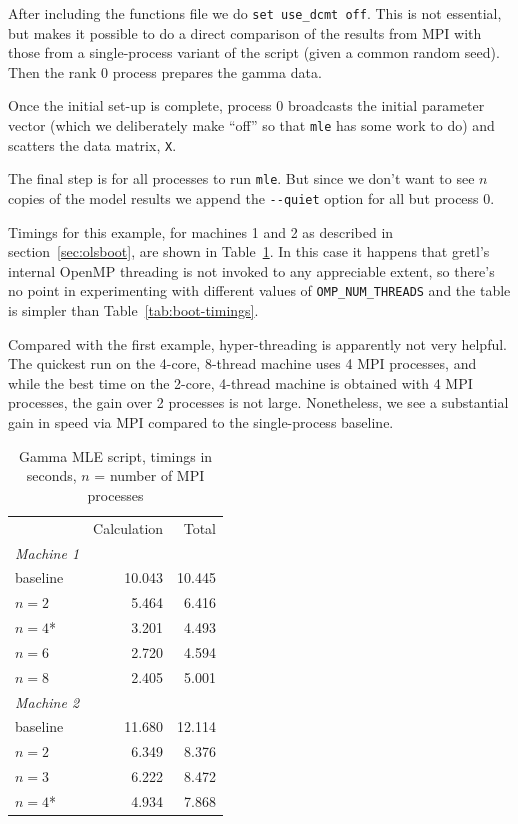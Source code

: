 \documentclass{article}
\begin{document}
After including the functions file we do \texttt{set use\_dcmt
  off}. This is not essential, but makes it possible to do a direct
comparison of the results from MPI with those from a single-process
variant of the script (given a common random seed). Then the rank 0
process prepares the gamma data.

Once the initial set-up is complete, process 0 broadcasts the initial
parameter vector (which we deliberately make ``off'' so that
\texttt{mle} has some work to do) and scatters the data matrix,
\texttt{X}.

The final step is for all processes to run \texttt{mle}. But since we
don't want to see $n$ copies of the model results we append the
\verb|--quiet| option for all but process 0.

Timings for this example, for machines 1 and 2 as described in
section~\ref{sec:olsboot}, are shown in Table~\ref{tab:mle-timings}.
In this case it happens that gretl's internal \textsf{OpenMP}
threading is not invoked to any appreciable extent, so there's no
point in experimenting with different values of \verb|OMP_NUM_THREADS|
and the table is simpler than Table~\ref{tab:boot-timings}.

Compared with the first example, hyper-threading is apparently not
very helpful. The quickest run on the 4-core, 8-thread machine uses 4
MPI processes, and while the best time on the 2-core, 4-thread machine
is obtained with 4 MPI processes, the gain over 2 processes is not
large. Nonetheless, we see a substantial gain in speed via MPI
compared to the single-process baseline.

\begin{table}[htbp]
\begin{center}
\begin{tabular}{lrr}
         & Calculation & Total \\
\textit{Machine 1} \\[2pt]
\quad baseline & 10.043 & 10.445 \\
\quad $n=2$ & 5.464 & 6.416 \\
\quad $n=4$* & 3.201 & 4.493 \\
\quad $n=6$ & 2.720 & 4.594 \\
\quad $n=8$ & 2.405 & 5.001 \\[2pt]
\textit{Machine 2} \\[2pt]
\quad baseline & 11.680 & 12.114 \\
\quad $n=2$ & 6.349 & 8.376 \\
\quad $n=3$ & 6.222 & 8.472 \\
\quad $n=4$* & 4.934 & 7.868
\end{tabular}
\end{center}
\caption{Gamma MLE script, timings in seconds, $n$ = number of MPI
  processes}
\label{tab:mle-timings}
\end{table}
\end{document}
